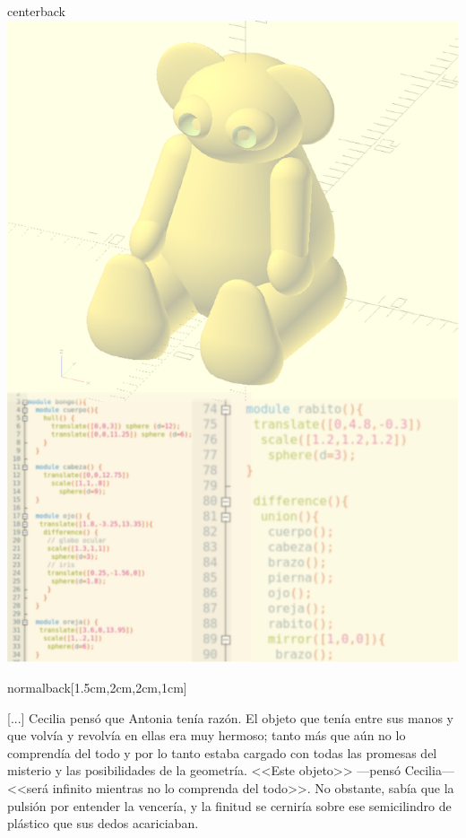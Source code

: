 \documentclass[coverwidth=148mm, coverheight=210mm, spinewidth=30mm,
flapwidth=7cm, wrapwidth=5mm, 11pt]{bookcover}
\begin{document}
\begin{bookcover}
  \begin{bookcoverelement}{center}{back}
    \includegraphics{contratapa-A5.pdf}
  \end{bookcoverelement}


  \begin{bookcoverelement}{normal}{back}[1.5cm,2cm,2cm,1cm]
    {\large

      \hspace{.5em} [...] Cecilia pensó que Antonia tenía razón. El objeto
      que tenía entre sus manos y que volvía y revolvía en ellas era muy
      hermoso; tanto más que aún no lo comprendía del todo y por lo
      tanto estaba cargado con todas las promesas del misterio y las
      posibilidades de la geometría. <<Este objeto>> ---pensó
      Cecilia--- <<será infinito mientras no lo comprenda del
      todo>>. No obstante, sabía que la pulsión por entender la
      vencería, y la finitud se cerniría sobre ese semicilindro de
      plástico que sus dedos acariciaban.

}
\end{bookcoverelement}
\end{bookcover}
\end{document}
